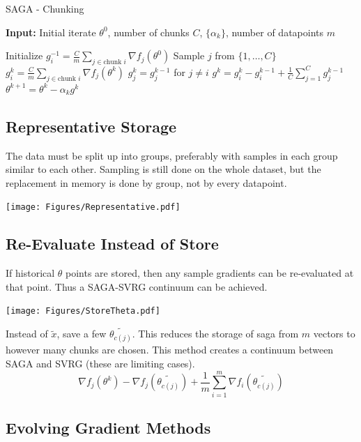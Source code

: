 \documentclass[11pt]{article}
\begin{document}
	\begin{algorithm}
		[H] 
		\caption{SAGA - Chunking}
		\label{alg:saga-chunking}
		{\bf Input:} Initial iterate $\theta^0$, number of chunks $C$, $\{ \alpha_k \}$, number of datapoints $m$
		\begin{algorithmic}
			[1] 
			\State Initialize $g_i^{-1} = \frac{C}{m} \sum_{j \in \mbox{chunk } i }  \nabla f_{j}(\theta^0) $
			\State Sample $j$ from $\{ 1, \ldots, C \}$
			\State $g_i^k = \frac{C}{m} \sum_{j\in \mbox{chunk } i }  \nabla f_{j}(\theta^k) $ 
			\State $ g_j^k = g_j^{k-1} $ for $j \neq i$ 
			\State $g^k =  g_i^{k} -  g_i^{k-1}  + \frac{1}{C} \sum_{j = 1}^{C}g_j^{k-1}$ 
			\State $\theta^{k+1} = \theta^k - \alpha_k g^k$ 
			\EndLoop 
		\end{algorithmic}
	\end{algorithm}
	
\subsection{Representative Storage}

The data must be split up into groups, preferably with samples in each group similar to each other. Sampling is still done on the whole dataset, but the replacement in memory is done by group, not by every datapoint. 

\texttt{[image: Figures/Representative.pdf]}

	
\subsection{Re-Evaluate Instead of Store}

If historical $\theta$ points are stored, then any sample gradients can be re-evaluated at that point. Thus a SAGA-SVRG continuum can be achieved.

\texttt{[image: Figures/StoreTheta.pdf]}

Instead of $\tilde{x}$, save a few $\tilde{\theta_{c(j)}}$. This reduces the storage of saga from $m$ vectors to however many chunks are chosen.
This method creates a continuum between SAGA and SVRG (these are limiting cases). 
\[ \nabla f_j(\theta^k) -  \nabla f_j(\tilde{\theta_{c(j)}}) + \frac{1}{m}\sum_{i=1}^{m}  \nabla f_i (\tilde{\theta_{c(j)}})\]
	
\subsection{Evolving Gradient Methods}
\end{document}

